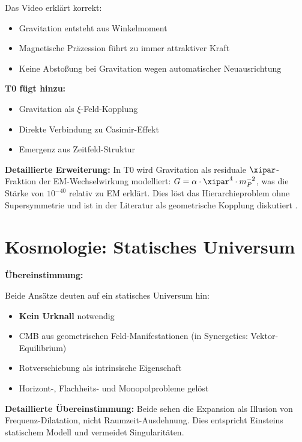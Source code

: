 	Das Video erklärt korrekt:
	\begin{itemize}
		\item Gravitation entsteht aus Winkelmoment
		\item Magnetische Präzession führt zu immer attraktiver Kraft
		\item Keine Abstoßung bei Gravitation wegen automatischer Neuausrichtung
	\end{itemize}
	
	\textbf{T0 fügt hinzu:}
	\begin{itemize}
		\item Gravitation als $\xi$-Feld-Kopplung
		\item Direkte Verbindung zu Casimir-Effekt
		\item Emergenz aus Zeitfeld-Struktur
	\end{itemize}
	
	\textbf{Detaillierte Erweiterung:} In T0 wird Gravitation als residuale $\xipar$-Fraktion der EM-Wechselwirkung modelliert: $G = \alpha \cdot \xipar^4 \cdot m_P^{-2}$, was die Stärke von $10^{-40}$ relativ zu EM erklärt. Dies löst das Hierarchieproblem ohne Supersymmetrie und ist in der Literatur als geometrische Kopplung diskutiert \cite{weinberg_1989}.
	
	\section{Kosmologie: Statisches Universum}
	
	\begin{gemeinsam}
		\textbf{Übereinstimmung:}
		
		Beide Ansätze deuten auf ein statisches Universum hin:
		\begin{itemize}
			\item \textbf{Kein Urknall} notwendig
			\item CMB aus geometrischen Feld-Manifestationen (in Synergetics: Vektor-Equilibrium)
			\item Rotverschiebung als intrinsische Eigenschaft
			\item Horizont-, Flachheits- und Monopolprobleme gelöst
		\end{itemize}
		
		\textbf{Detaillierte Übereinstimmung:} Beide sehen die Expansion als Illusion von Frequenz-Dilatation, nicht Raumzeit-Ausdehnung. Dies entspricht Einsteins statischem Modell \cite{einstein_1917} und vermeidet Singularitäten.
	\end{gemeinsam}
	

